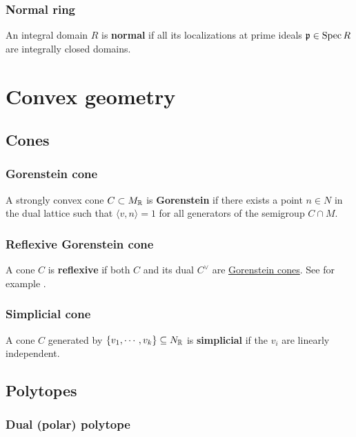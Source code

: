 \documentclass[11pt, english]{article}
\begin{document}
\subsubsection{Normal ring}
\label{normalring}

An integral domain $R$ is \textbf{normal} if all its localizations at prime ideals ${\mathfrak{p} \in \operatorname{Spec} R}$ are integrally closed domains.  

\section{Convex geometry}
\subsection{Cones}
\subsubsection{Gorenstein cone}
\label{gorensteincone}

A strongly convex cone $C \subset M_{\mathbb{R}}$ is \textbf{Gorenstein} if there exists a point $n \in N$ in the dual lattice such that $\langle v,n \rangle = 1$ for all generators of the semigroup $C \cap M$.

\subsubsection{Reflexive Gorenstein cone}
\label{reflexivegorensteincone}

A cone $C$ is \textbf{reflexive} if both $C$ and its dual $C^\vee$ are \hyperref[gorensteincone]{Gorenstein cones}. See for example \cite{mirrorsymalggeo}.

\subsubsection{Simplicial cone}
A cone $C$ generated by $\{v_1, \cdots, v_k \} \subseteq N_{\mathbb{R}}$ is \textbf{simplicial} if the $v_i$ are linearly independent.

\subsection{Polytopes}

\subsubsection{Dual (polar) polytope}
\label{polarpolyhedron}
\end{document}
